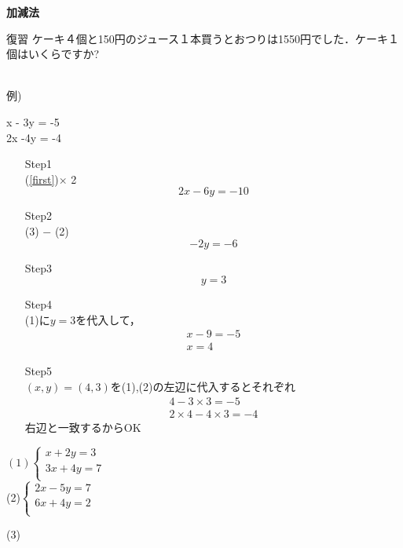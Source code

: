 \documentclass[b4paper,16.5pt,paparesize, landscape]{ltjsarticle}%
\begin{document}
{\textbf{\Large{加減法}}}\hspace{\fill}{\scalebox{1.5}{（　）組（　　　　　　　　）}}\\
\begin{multicols*}{3}
	\begin{itembox}[l]{復習}
		ケーキ４個と150円のジュース１本買うとおつりは1550円でした．ケーキ１個はいくらですか?
		\end{itembox}
	\\[10pt]
	例)
	\begin{numcases}
		{}
		x - 3y = -5 \label{first}\\
		2x -4y = -4 \label{second}
	\end{numcases}
\begin{enumerate}
	\item[Step1]\hfill\\
		(\ref{first})$\times$ 2\\
		\begin{equation}
			2x - 6y = -10
		\end{equation}
	\item[Step2]\hfill\\
		(3) $ - $ (2)
			\begin{equation*}
				-2y = -6
			\end{equation*}
	\item[Step3]\hfill\\
		\begin{equation*}
			y = 3
		\end{equation*}
	\item[Step4]\hfill\\
		(1)に$y=3$を代入して，
		\begin{gather*}
			x - 9 = -5\\
			x = 4
		\end{gather*}
	\item[Step5]\hfill\\	
		$(x,y) = (4,3)$を(1),(2)の左辺に代入するとそれぞれ
		\begin{eqnarray*}
			4 - 3\times 3 = -5 \\
			2\times 4 - 4\times 3 = -4
		\end{eqnarray*}
		右辺と一致するからOK
		
\end{enumerate}
\vfill\null\columnbreak

$(1)\begin{cases}
			x + 2y  = 3\\
			3x + 4y = 7\\
\end{cases}$ 	\\[90mm]
(2)$\begin{cases}
			2x  - 5y = 7\\
			6x + 4y = 2\\
\end{cases}$


 \vfill\null\columnbreak
 \begin{itembox}[l]{(3)}
	 \vspace{25mm}
 \end{itembox}

\end{multicols*}
\end{document}
